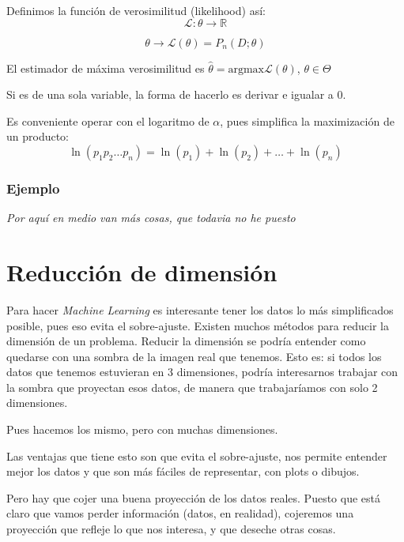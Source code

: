 \documentclass[a4paper,10pt]{article}
\begin{document}
Definimos la función de verosimilitud (likelihood) así:
\begin{equation*}
\mathcal{L} : \theta \rightarrow \mathbb{R}
\end{equation*}

\begin{equation*}
\theta \rightarrow \mathcal{L}(\theta) = P_n(D;\theta)
\end{equation*}

El estimador de máxima verosimilitud es $\hat{\theta} = \text{argmax} \mathcal{L}(\theta)$, $\theta \in \Theta$

Si es de una sola variable, la forma de hacerlo es derivar e igualar a 0.

Es conveniente operar con el logaritmo de $\alpha$, pues simplifica la maximización de un producto:
\begin{equation*}
\ln{(p_1p_2\dots p_n)} = \ln{(p_1)} + \ln{(p_2)} + \dots + \ln{(p_n)}
\end{equation*}

\subsubsection*{Ejemplo}

\textit{Por aquí en medio van más cosas, que todavia no he puesto}

\section{Reducción de dimensión}
Para hacer \textit{Machine Learning} es interesante tener los datos lo más simplificados posible, pues eso evita el sobre-ajuste. Existen muchos métodos para reducir la dimensión de un problema. Reducir la dimensión se podría entender como quedarse con una sombra de la imagen real que tenemos. Esto es: si todos los datos que tenemos estuvieran en 3 dimensiones, podría interesarnos trabajar con la sombra que proyectan esos datos, de manera que trabajaríamos con solo 2 dimensiones.

Pues hacemos los mismo, pero con muchas dimensiones.

Las ventajas que tiene esto son que evita el sobre-ajuste, nos permite entender mejor los datos y que son más fáciles de representar, con plots o dibujos.

Pero hay que cojer una buena proyección de los datos reales. Puesto que está claro que vamos perder información (datos, en realidad), cojeremos una proyección que refleje lo que nos interesa, y que deseche otras cosas.
\end{document}
